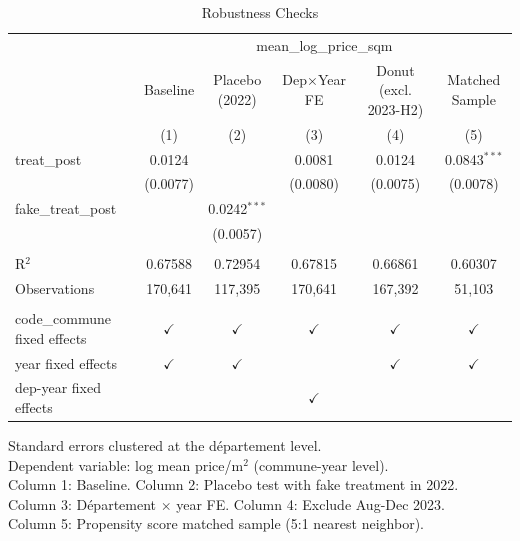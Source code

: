 
\begin{table}[htbp]
   \caption{\label{tab:robustness} Robustness Checks}
   \bigskip
   \centering
   \begin{tabular}{lccccc}
      \toprule
       & \multicolumn{5}{c}{mean\_log\_price\_sqm}\\
                                   & Baseline      & Placebo (2022) & Dep×Year FE   & Donut (excl. 2023-H2) & Matched Sample \\   
                                   & (1)           & (2)            & (3)           & (4)                   & (5)\\  
      \midrule 
      treat\_post                  & 0.0124        &                & 0.0081        & 0.0124                & 0.0843$^{***}$\\   
                                   & (0.0077)      &                & (0.0080)      & (0.0075)              & (0.0078)\\   
      fake\_treat\_post            &               & 0.0242$^{***}$ &               &                       &   \\   
                                   &               & (0.0057)       &               &                       &   \\   
       \\
      R$^2$                        & 0.67588       & 0.72954        & 0.67815       & 0.66861               & 0.60307\\  
      Observations                 & 170,641       & 117,395        & 170,641       & 167,392               & 51,103\\  
       \\
      code\_commune fixed effects  & $\checkmark$  & $\checkmark$   & $\checkmark$  & $\checkmark$          & $\checkmark$\\   
      year fixed effects           & $\checkmark$  & $\checkmark$   &               & $\checkmark$          & $\checkmark$\\   
      dep-year fixed effects       &               &                & $\checkmark$  &                       & \\  
      \bottomrule
   \end{tabular}
   
   \par \raggedright 
   Standard errors clustered at the d\'epartement level.\\
   Dependent variable: log mean price/m$^2$ (commune-year level).\\
   Column 1: Baseline. Column 2: Placebo test with fake treatment in 2022.\\
   Column 3: D\'epartement $\times$ year FE. Column 4: Exclude Aug-Dec 2023.\\
   Column 5: Propensity score matched sample (5:1 nearest neighbor).
\end{table}


